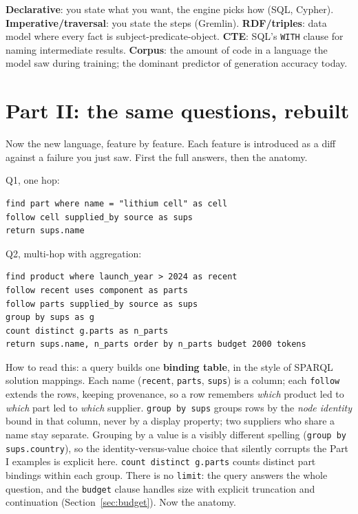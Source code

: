 \documentclass[11pt]{article}
\begin{document}
\begin{glossbox}
\textbf{Declarative}: you state what you want, the engine picks how (SQL, Cypher). \textbf{Imperative/traversal}: you state the steps (Gremlin). \textbf{RDF/triples}: data model where every fact is subject-predicate-object. \textbf{CTE}: SQL's \texttt{WITH} clause for naming intermediate results. \textbf{Corpus}: the amount of code in a language the model saw during training; the dominant predictor of generation accuracy today.
\end{glossbox}

\section{Part II: the same questions, rebuilt}

Now the new language, feature by feature. Each feature is introduced as a diff against a failure you just saw. First the full answers, then the anatomy.

Q1, one hop:

\begin{lstlisting}[style=new]
find part where name = "lithium cell" as cell
follow cell supplied_by source as sups
return sups.name
\end{lstlisting}

Q2, multi-hop with aggregation:

\begin{lstlisting}[style=new]
find product where launch_year > 2024 as recent
follow recent uses component as parts
follow parts supplied_by source as sups
group by sups as g
count distinct g.parts as n_parts
return sups.name, n_parts order by n_parts budget 2000 tokens
\end{lstlisting}

How to read this: a query builds one \textbf{binding table}, in the style of SPARQL solution mappings. Each name (\texttt{recent}, \texttt{parts}, \texttt{sups}) is a column; each \texttt{follow} extends the rows, keeping provenance, so a row remembers \emph{which} product led to \emph{which} part led to \emph{which} supplier. \texttt{group by sups} groups rows by the \emph{node identity} bound in that column, never by a display property; two suppliers who share a name stay separate. Grouping by a value is a visibly different spelling (\texttt{group by sups.country}), so the identity-versus-value choice that silently corrupts the Part I examples is explicit here. \texttt{count distinct g.parts} counts distinct part bindings within each group. There is no \texttt{limit}: the query answers the whole question, and the \texttt{budget} clause handles size with explicit truncation and continuation (Section~\ref{sec:budget}). Now the anatomy.
\end{document}
